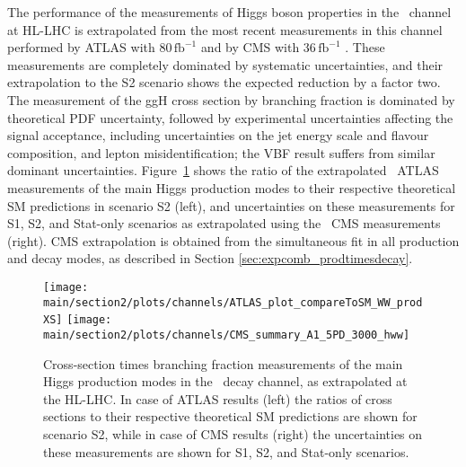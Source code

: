 The performance of the measurements of Higgs boson properties in the \HWW\ channel at HL-LHC is extrapolated from the most recent measurements in this channel performed by ATLAS with 80\,$\mathrm{fb}^{-1}$ \cite{Aaboud:2018jqu} and by CMS with 36\,$\mathrm{fb}^{-1}$ \cite{Sirunyan:2018egh}. These measurements are completely dominated by systematic uncertainties, and their extrapolation to the S2 scenario shows the expected reduction by a factor two. The measurement of the ggH cross section by branching fraction is dominated by theoretical PDF uncertainty, followed by experimental uncertainties affecting the signal acceptance, including uncertainties on the jet energy scale and flavour composition, and lepton misidentification; the VBF result suffers from similar dominant uncertainties.
Figure~\ref{fig:HWW_ATLAS_HLLHC_S2} shows the ratio of the extrapolated \HWW\ ATLAS measurements of the main Higgs production modes to their respective theoretical SM predictions in scenario S2 (left), and uncertainties on these measurements for S1, S2, and Stat-only scenarios as extrapolated using the \HWW\ CMS measurements (right). CMS extrapolation is obtained from the simultaneous fit in all production and decay modes, as described in Section \ref{sec:expcomb_prodtimesdecay}.

\begin{figure}
  \centering
  \texttt{[image: \\main/section2/plots/channels/ATLAS\_plot\_compareToSM\_WW\_prodXS]}
  \texttt{[image: \\main/section2/plots/channels/CMS\_summary\_A1\_5PD\_3000\_hww]}
  \caption{Cross-section times branching fraction measurements of the main Higgs production modes in the \HWW\ decay channel, as extrapolated at the HL-LHC. In case of ATLAS results (left) the ratios of cross sections to their respective theoretical SM predictions are shown for scenario S2, while in case of CMS results (right) the uncertainties on these measurements are shown for S1, S2, and Stat-only scenarios.}
  \label{fig:HWW_ATLAS_HLLHC_S2}
\end{figure}
